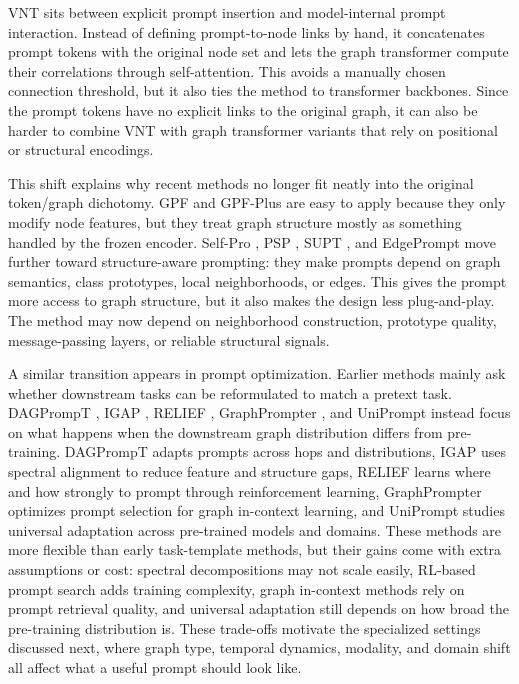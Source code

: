 VNT \cite{tan2023virtual} sits between explicit prompt insertion and model-internal prompt interaction. Instead of defining prompt-to-node links by hand, it concatenates prompt tokens with the original node set and lets the graph transformer compute their correlations through self-attention. This avoids a manually chosen connection threshold, but it also ties the method to transformer backbones. Since the prompt tokens have no explicit links to the original graph, it can also be harder to combine VNT with graph transformer variants that rely on positional or structural encodings.

This shift explains why recent methods no longer fit neatly into the original token/graph dichotomy. GPF and GPF-Plus are easy to apply because they only modify node features, but they treat graph structure mostly as something handled by the frozen encoder. Self-Pro \cite{gong2024selfpro}, PSP \cite{ge2024psp}, SUPT \cite{lee2024supt}, and EdgePrompt \cite{fu2025edge} move further toward structure-aware prompting: they make prompts depend on graph semantics, class prototypes, local neighborhoods, or edges. This gives the prompt more access to graph structure, but it also makes the design less plug-and-play. The method may now depend on neighborhood construction, prototype quality, message-passing layers, or reliable structural signals.

A similar transition appears in prompt optimization. Earlier methods mainly ask whether downstream tasks can be reformulated to match a pretext task. DAGPrompT \cite{chen2025dagprompt}, IGAP \cite{yan2024igap}, RELIEF \cite{zhu2024relief}, GraphPrompter \cite{lv2025graphprompter}, and UniPrompt \cite{huang2025oneprompt} instead focus on what happens when the downstream graph distribution differs from pre-training. DAGPrompT adapts prompts across hops and distributions, IGAP uses spectral alignment to reduce feature and structure gaps, RELIEF learns where and how strongly to prompt through reinforcement learning, GraphPrompter optimizes prompt selection for graph in-context learning, and UniPrompt studies universal adaptation across pre-trained models and domains. These methods are more flexible than early task-template methods, but their gains come with extra assumptions or cost: spectral decompositions may not scale easily, RL-based prompt search adds training complexity, graph in-context methods rely on prompt retrieval quality, and universal adaptation still depends on how broad the pre-training distribution is. These trade-offs motivate the specialized settings discussed next, where graph type, temporal dynamics, modality, and domain shift all affect what a useful prompt should look like.


